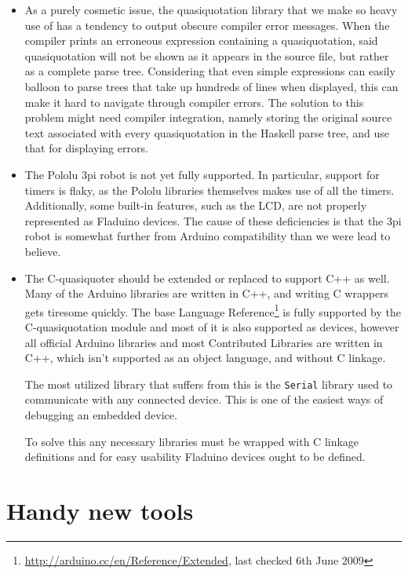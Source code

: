 \documentclass[a4paper, oneside, final]{memoir}
\begin{document}
\begin{itemize}
\item As a purely cosmetic issue, the quasiquotation library that we
  make so heavy use of has a tendency to output obscure compiler error
  messages.  When the compiler prints an erroneous expression
  containing a quasiquotation, said quasiquotation will not be shown
  as it appears in the source file, but rather as a complete parse
  tree.  Considering that even simple expressions can easily balloon
  to parse trees that take up hundreds of lines when displayed, this
  can make it hard to navigate through compiler errors.  The solution
  to this problem might need compiler integration, namely storing the
  original source text associated with every quasiquotation in the
  Haskell parse tree, and use that for displaying errors.
\item The Pololu 3pi robot is not yet fully supported.  In particular,
  support for timers is flaky, as the Pololu libraries themselves
  makes use of all the timers.  Additionally, some built-in features, such
  as the LCD, are not properly represented as Fladuino devices.  The
  cause of these deficiencies is that the 3pi robot is somewhat
  further from Arduino compatibility than we were lead to believe.
\item The C-quasiquoter should be extended or replaced to support C++
  as well.  Many of the Arduino libraries are written in C++, and
  writing C wrappers gets tiresome quickly.  The base Language
  Reference\footnote{\url{http://arduino.cc/en/Reference/Extended},
    last checked 6th June 2009} is fully supported by the
  C-quasiquotation module and most of it is also supported as devices,
  however all official Arduino libraries and most Contributed
  Libraries are written in C++, which isn't supported as an object
  language, and without C linkage.

  The most utilized library that suffers from this is the \texttt{Serial}
  library used to communicate with any connected device. This is one
  of the easiest ways of debugging an embedded device.

  To solve this any necessary libraries must be wrapped with C linkage
  definitions and for easy usability Fladuino devices ought to be
  defined.
\end{itemize}

\section{Handy new tools}
\end{document}
